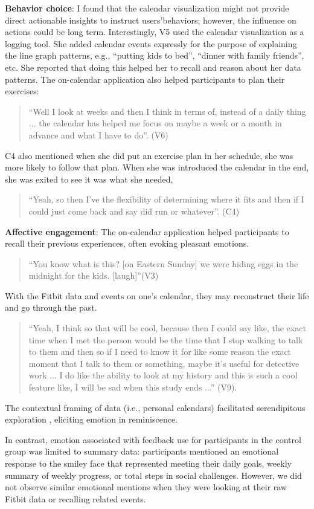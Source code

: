 \documentclass[12pt,oneside]{book}
\begin{document}
\textbf{Behavior choice}: I found that the calendar visualization might not provide direct actionable insights to instruct users\rq behaviors; however, the influence on actions could be long term. Interestingly, V5 used the calendar visualization as a logging tool.  She added calendar events expressly for the purpose of explaining the line graph patterns, e.g., ``putting kids to bed'', ``dinner with family friends'', etc. She reported that doing this helped her to recall and reason about her data patterns. The on-calendar application also helped participants to plan their exercises: 
\begin{quote}
``Well I look at weeks and then I think in terms of, instead of a daily thing ... the calendar has helped me focus on maybe a week or a month in advance and what I have to do''. (V6) 
\end{quote}
C4 also mentioned when she did put an exercise plan in her schedule, she was more likely to follow that plan. When she was introduced the calendar in the end, she was exited to see it was what she needed, 
\begin{quote}
``Yeah, so then I{\rq}ve the flexibility of determining where it fits and then if I could just come back and say did run or whatever''. (C4)
\end{quote}

\textbf{Affective engagement}: The on-calendar application helped participants to recall their previous experiences, often evoking pleasant emotions. 
\begin{quote}
``You know what is this? [on Eastern Sunday] we were hiding eggs in the midnight for the kids. [laugh]''(V3) 
\end{quote}
With the Fitbit data and events on one’s calendar, they may reconstruct their life and go through the past. 
\begin{quote}
``Yeah, I think so that will be cool, because then I could say like, the exact time when I met the person would be the time that I stop walking to talk to them and then so if I need to know it for like some reason the exact moment that I talk to them or something, maybe it’s useful for detective work ... I do like the ability to look at my history and this is such a cool feature like, I will be sad when this study ends ...'' (V9). 
\end{quote}
The contextual framing of data (i.e., personal calendars) facilitated serendipitous exploration \cite{thudt_visual_2015}, eliciting emotion in reminiscence. 

In contrast, emotion associated with feedback use for participants in the control group was limited to summary data: participants mentioned an emotional response to the smiley face that represented meeting their daily goals, weekly summary of weekly progress, or total steps in social challenges. 
However, we did not observe similar emotional mentions when they were looking at their raw Fitbit data or recalling related events.%
\end{document}
